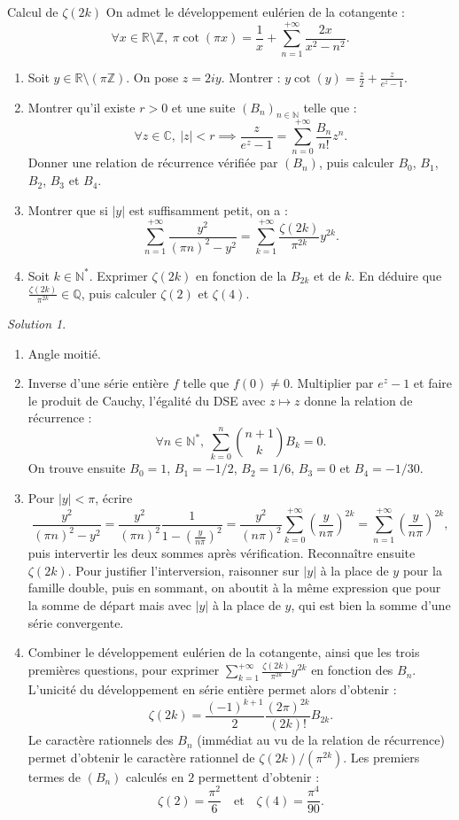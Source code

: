 \documentclass[french]{book}
\newcommand{\N}{\mathbb{N}}
\newcommand{\Z}{\mathbb{Z}}
\newcommand{\Q}{\mathbb{Q}}
\newcommand{\R}{\mathbb{R}}
\newcommand{\C}{\mathbb{C}}
\newcommand{\st}{^*}
\theoremstyle{definition}
\theoremstyle{remark}
\newtheorem*{sol}{Solution}
\begin{document}
\begin{exo}[3]{Calcul de $\zeta(2k)$}
	On admet le développement eulérien de la cotangente :
	$$\forall x\in\R\setminus\Z,\ \pi\cot(\pi x)=\frac{1}{x}+\sum_{n=1}^{+\infty}\frac{2x}{x^2-n^2}.$$
	\begin{enumerate}
		\item Soit $y\in\R\setminus (\pi\Z)$. On pose $z=2iy$. Montrer : $\displaystyle y\cot(y)=\frac{z}{2}+\frac{z}{e^z-1}$.
		\item Montrer qu'il existe $r>0$ et une suite $(B_n)_{n\in\N}$ telle que :
		$$\forall z\in\C,\ \lvert z\rvert <r\implies\frac{z}{e^z-1}=\sum_{n=0}^{+\infty}\frac{B_n}{n!}z^n.$$
		Donner une relation de récurrence vérifiée par $(B_n)$, puis calculer $B_0$, $B_1$, $B_2$, $B_3$ et $B_4$.
		\item Montrer que si $\lvert y\rvert$ est suffisamment petit, on a :
		$$\sum_{n=1}^{+\infty}\frac{y^2}{(\pi n)^2-y^2}=\sum_{k=1}^{+\infty}\frac{\zeta(2k)}{\pi^{2k}}y^{2k}.$$
		\item Soit $k\in\N\st$. Exprimer $\zeta(2k)$ en fonction de la $B_{2k}$ et de $k$. En déduire que $\displaystyle\frac{\zeta(2k)}{\pi^{2k}}\in\Q$, puis calculer $\zeta(2)$ et $\zeta(4)$.
	\end{enumerate}
\end{exo}
\begin{sol}
	\begin{enumerate}
		\item Angle moitié.
		\item Inverse d'une série entière $f$ telle que $f(0)\ne 0$. Multiplier par $e^{z}-1$ et faire le produit de Cauchy, l'égalité du DSE avec $z\mapsto z$ donne la relation de récurrence :
		$$\forall n\in\N\st,\ \sum_{k=0}^{n}\binom{n+1}{k}B_k=0.$$ On trouve ensuite $B_0=1$, $B_1=-1/2$, $B_2=1/6$, $B_3=0$ et $B_4=-1/30$.
		\item Pour $\lvert y\rvert <\pi$, écrire 
		$$\frac{y^2}{(\pi n)^2-y^2}=\frac{y^2}{(\pi n)^2}\frac{1}{1-\left(\frac{y}{n\pi}\right)^2}=\frac{y^2}{(n\pi)^2}\sum_{k=0}^{+\infty}\left(\frac{y}{n\pi}\right)^{2k}=\sum_{n=1}^{+\infty}\left(\frac{y}{n\pi}\right)^{2k},$$ puis intervertir les deux sommes après vérification. Reconnaître ensuite $\zeta(2k)$. Pour justifier l'interversion, raisonner sur $\lvert y\rvert$ à la place de $y$ pour la famille double, puis en sommant, on aboutit à la même expression que pour la somme de départ mais avec $\lvert y\rvert$ à la place de $y$, qui est bien la somme d'une série convergente.
		\item Combiner le développement eulérien de la cotangente, ainsi que les trois premières questions, pour exprimer $\displaystyle\sum_{k=1}^{+\infty}\frac{\zeta(2k)}{\pi^{2k}}y^{2k}$ en fonction des $B_n$. L'unicité du développement en série entière permet alors d'obtenir :
		$$\zeta(2k)=\frac{(-1)^{k+1}}{2}\frac{(2\pi)^{2k}}{(2k)!}B_{2k}.$$
		Le caractère rationnels des $B_n$ (immédiat au vu de la relation de récurrence) permet d'obtenir le caractère rationnel de $\zeta(2k)/(\pi^{2k})$. Les premiers termes de $(B_n)$ calculés en $2$ permettent d'obtenir :
		$$\zeta(2)=\frac{\pi^2}{6}\quad\text{et}\quad\zeta(4)=\frac{\pi^4}{90}.$$
	\end{enumerate}
\end{sol}
\end{document}
